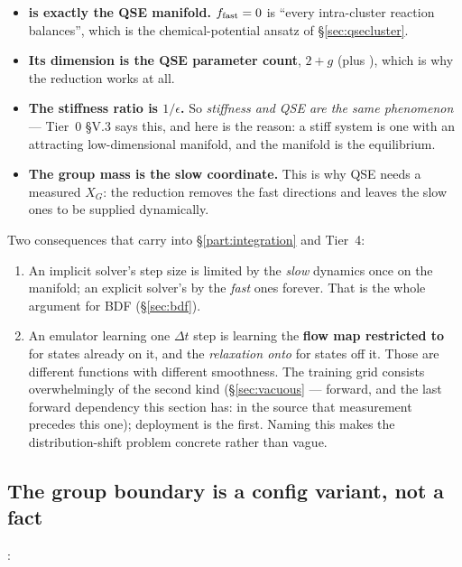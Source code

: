\begin{itemize}
\item \textbf{\Mslow{} is exactly the QSE manifold.} $f_{\rm fast} = 0$ is
  ``every intra-cluster reaction balances'', which is the chemical-potential
  ansatz of \S\ref{sec:qsecluster}.
\item \textbf{Its dimension is the QSE parameter count}, $2 + g$ (plus \Ye),
  which is why the reduction works at all.
\item \textbf{The stiffness ratio is $1/\epsilon$.} So \emph{stiffness and QSE
  are the same phenomenon} --- Tier~0 \S V.3 says this, and here is the reason:
  a stiff system is one with an attracting low-dimensional manifold, and the
  manifold is the equilibrium.
\item \textbf{The group mass is the slow coordinate.} This is why QSE needs a
  measured $X_G$: the reduction removes the fast directions and leaves the slow
  ones to be supplied dynamically.
\end{itemize}

Two consequences that carry into \S\ref{part:integration} and Tier~4:

\begin{enumerate}
\item An implicit solver's step size is limited by the \emph{slow} dynamics once
  on the manifold; an explicit solver's by the \emph{fast} ones forever. That is
  the whole argument for BDF (\S\ref{sec:bdf}).
\item An emulator learning one $\Delta t$ step is learning the \textbf{flow map
  restricted to \Mslow} for states already on it, and the \emph{relaxation onto}
  \Mslow{} for states off it. Those are different functions with different
  smoothness. The training grid consists overwhelmingly of the second kind
  (\S\ref{sec:vacuous} --- forward, and the last forward dependency this section
  has: in the source that measurement precedes this one); deployment is the
  first. Naming this makes the distribution-shift problem concrete rather than
  vague.
\end{enumerate}

\subsection{The group boundary is a config variant, not a fact}
\label{sec:groupboundary}

:

